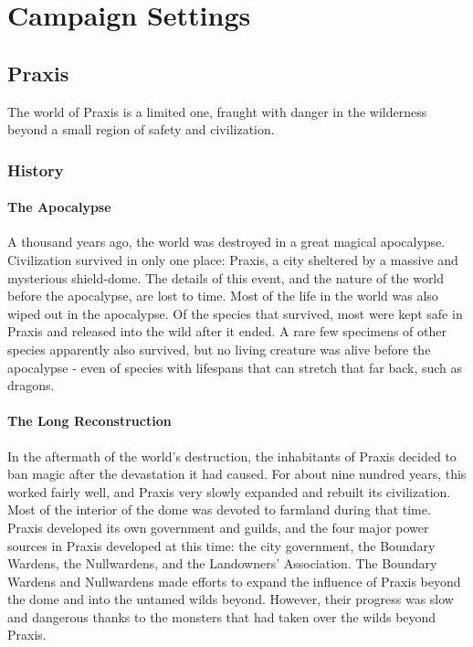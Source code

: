 \chapter{Campaign Settings}\label{Campaign Settings}

\section{Praxis}
    The world of Praxis is a limited one, fraught with danger in the wilderness beyond a small region of safety and civilization.

    \subsection{History}

        \subsubsection{The Apocalypse}
            A thousand years ago, the world was destroyed in a great magical apocalypse.
            Civilization survived in only one place: Praxis, a city sheltered by a massive and mysterious shield-dome.
            The details of this event, and the nature of the world before the apocalypse, are lost to time.
            Most of the life in the world was also wiped out in the apocalypse.
            Of the species that survived, most were kept safe in Praxis and released into the wild after it ended.
            A rare few specimens of other species apparently also survived, but no living creature was alive before the apocalypse - even of species with lifespans that can stretch that far back, such as dragons.

        \subsubsection{The Long Reconstruction}
            In the aftermath of the world's destruction, the inhabitants of Praxis decided to ban magic after the devastation it had caused.
            For about nine nundred years, this worked fairly well, and Praxis very slowly expanded and rebuilt its civilization.
            Most of the interior of the dome was devoted to farmland during that time.
            Praxis developed its own government and guilds, and the four major power sources in Praxis developed at this time: the city government, the Boundary Wardens, the Nullwardens, and the Landowners' Association.
            The Boundary Wardens and Nullwardens made efforts to expand the influence of Praxis beyond the dome and into the untamed wilds beyond.
            However, their progress was slow and dangerous thanks to the monsters that had taken over the wilds beyond Praxis.

